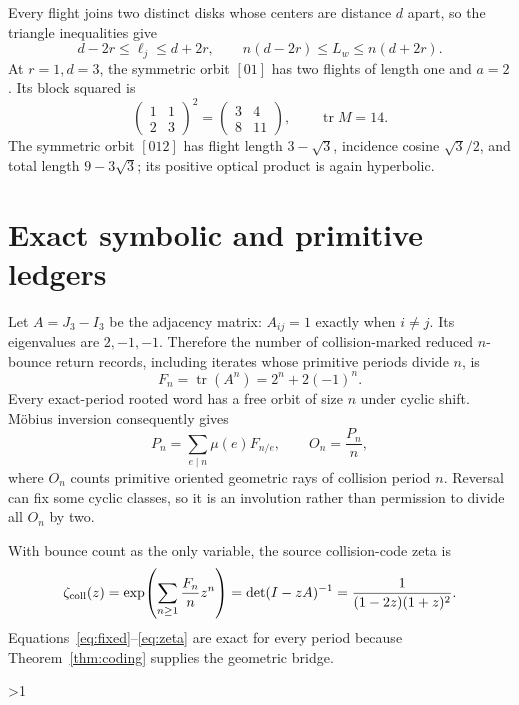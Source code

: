 \documentclass[10pt]{article}
\providecommand{\CRevisionRound}{2}
\newcommand{\tr}{\operatorname{tr}}
\begin{document}
Every flight joins two distinct disks whose centers are distance $d$ apart,
so the triangle inequalities give
\begin{equation}\label{eq:bounds}
 d-2r\le\ell_j\le d+2r,
 \qquad n(d-2r)\le L_w\le n(d+2r).
\end{equation}
At $r=1,d=3$, the symmetric orbit $[01]$ has two flights of length one and
$a=2$.  Its block squared is
\[
 \begin{pmatrix}1&1\\2&3\end{pmatrix}^{\!2}
 =\begin{pmatrix}3&4\\8&11\end{pmatrix},\qquad \tr M=14.
\]
The symmetric orbit $[012]$ has flight length $3-\sqrt3$, incidence cosine
$\sqrt3/2$, and total length $9-3\sqrt3$; its positive optical product is
again hyperbolic.
\fi

\section{Exact symbolic and primitive ledgers}
Let $A=J_3-I_3$ be the adjacency matrix: $A_{ij}=1$ exactly when $i\ne j$.
Its eigenvalues are $2,-1,-1$.  Therefore the number of collision-marked
reduced $n$-bounce return records, including iterates whose primitive periods
divide $n$, is
\begin{equation}\label{eq:fixed}
 F_n=\tr(A^n)=2^n+2(-1)^n.
\end{equation}
Every exact-period rooted word has a free orbit of size $n$ under cyclic
shift.  Möbius inversion consequently gives
\begin{equation}\label{eq:primitive}
 P_n=\sum_{e\mid n}\mu(e)F_{n/e},
 \qquad O_n=\frac{P_n}{n},
\end{equation}
where $O_n$ counts primitive oriented geometric rays of collision period
$n$.  Reversal can fix some cyclic classes, so it is an involution rather
than permission to divide all $O_n$ by two.

With bounce count as the only variable, the source collision-code zeta is
\begin{equation}\label{eq:zeta}
 \zeta_{\rm coll}(z)
 =\exp\!\left(\sum_{n\ge1}\frac{F_n}{n}z^n\right)
 =\det(I-zA)^{-1}
 =\frac{1}{(1-2z)(1+z)^2}.
\end{equation}
Equations~\eqref{eq:fixed}--\eqref{eq:zeta} are exact for every period because
Theorem~\ref{thm:coding} supplies the geometric bridge.

\ifnum\CRevisionRound>1
\end{document}
